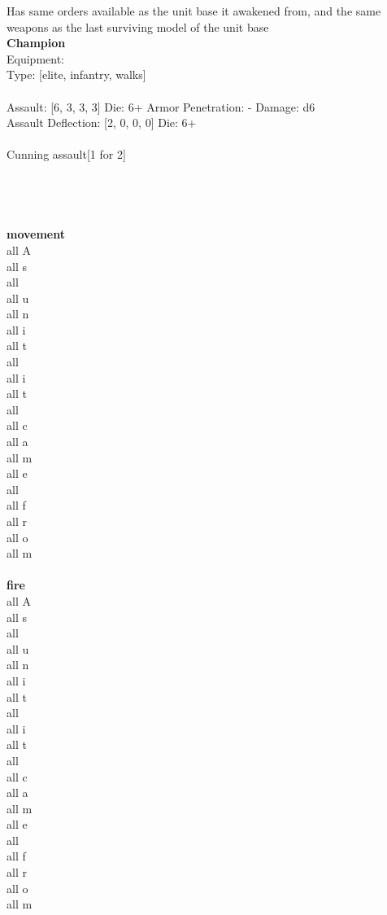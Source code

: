 \noindent Has same orders available as the unit base it awakened from, and the same weapons as the last surviving model of the unit base\\ 


{\bf Champion } \\
Equipment:  \\
Type: [elite, infantry, walks] \\
\ \\
Assault: [6, 3, 3, 3] Die: 6+ Armor Penetration: - Damage: d6 \\
Assault Deflection: [2, 0, 0, 0] Die: 6+\\
\\ 
Cunning assault[1 for 2]\\ 
 
\ \\

\ \\
 
\ \\




\ \\ {\bf movement } \\
all A \\
all s \\
all   \\
all u \\
all n \\
all i \\
all t \\
all   \\
all i \\
all t \\
all   \\
all c \\
all a \\
all m \\
all e \\
all   \\
all f \\
all r \\
all o \\
all m \\
\ \\ {\bf fire } \\
all A \\
all s \\
all   \\
all u \\
all n \\
all i \\
all t \\
all   \\
all i \\
all t \\
all   \\
all c \\
all a \\
all m \\
all e \\
all   \\
all f \\
all r \\
all o \\
all m \\


